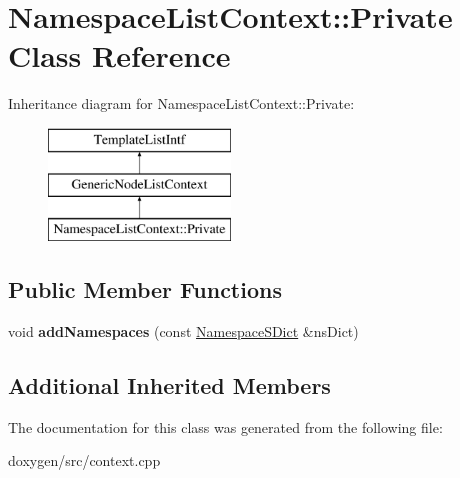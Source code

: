 \hypertarget{class_namespace_list_context_1_1_private}{}\section{Namespace\+List\+Context\+::Private Class Reference}
\label{class_namespace_list_context_1_1_private}
Inheritance diagram for Namespace\+List\+Context\+::Private\+:\begin{figure}[H]
\begin{center}
\leavevmode
\includegraphics[height=3.000000cm]{class_namespace_list_context_1_1_private}
\end{center}
\end{figure}
\subsection*{Public Member Functions}
\begin{DoxyCompactItemize}
\item 
\mbox{\label{class_namespace_list_context_1_1_private_a4c3c4069e2e605b07e29f1f9462d0dbf}} 
void {\bfseries add\+Namespaces} (const \mbox{\hyperlink{class_namespace_s_dict}{Namespace\+S\+Dict}} \&ns\+Dict)
\end{DoxyCompactItemize}
\subsection*{Additional Inherited Members}


The documentation for this class was generated from the following file\+:\begin{DoxyCompactItemize}
\item 
doxygen/src/context.\+cpp\end{DoxyCompactItemize}
